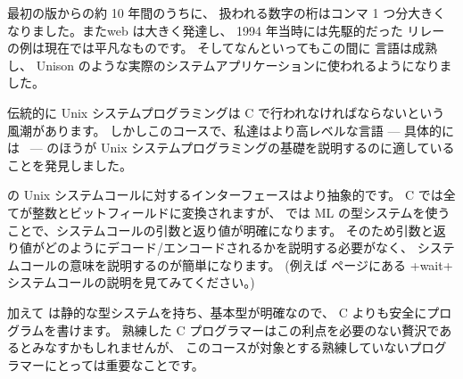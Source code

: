 最初の版からの約 10 年間のうちに、 扱われる数字の桁はコンマ 1 つ分大きくなりました。またweb は大きく発達し、
1994 年当時には先駆的だった \http リレーの例は現在では平凡なものです。
そしてなんといってもこの間に \ocaml 言語は成熟し、
Unison \cite{Unison} のような実際のシステムアプリケーションに使われるようになりました。

伝統的に Unix システムプログラミングは C で行われなければならないという風潮があります。
しかしこのコースで、私達はより高レベルな言語 --- 具体的には \ocaml\ --- のほうが Unix システムプログラミングの基礎を説明するのに適していることを発見しました。

\ocaml の Unix システムコールに対するインターフェースはより抽象的です。
C では全てが整数とビットフィールドに変換されますが、
\ocaml では ML の型システムを使うことで、システムコールの引数と返り値が明確になります。
そのため引数と返り値がどのようにデコード/エンコードされるかを説明する必要がなく、
システムコールの意味を説明するのが簡単になります。 (例えば \pageref{wait} ページにある \ml+wait+ システムコールの説明を見てみてください。)

加えて \ocaml は静的な型システムを持ち、基本型が明確なので、 C よりも安全にプログラムを書けます。
熟練した C プログラマーはこの利点を必要のない贅沢であるとみなすかもしれませんが、
このコースが対象とする熟練していないプログラマーにとっては重要なことです。


